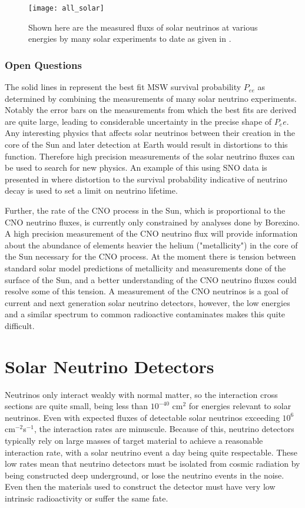 \begin{figure}
\centering
\texttt{[image: all\_solar]}
\caption{\label{fig:global_solar}Shown here are the measured fluxs of solar neutrinos at various energies by many solar experiments to date as given in \cite{nonstandard_interactions}.}
\end{figure}

\subsection{Open Questions}
The solid lines in  represent the best fit MSW survival probability $P_{ee}$ as determined by combining the measurements of many solar neutrino experiments.
Notably the error bars on the measurements from which the best fits are derived are quite large, leading to considerable uncertainty in the precise shape of $P_ee$.
Any interesting physics that affects solar neutrinos between their creation in the core of the Sun and later detection at Earth would result in distortions to this function.
Therefore high precision measurements of the solar neutrino fluxes can be used to search for new physics. 
An example of this using SNO data is presented in  where distortion to the survival probability indicative of neutrino decay is used to set a limit on neutrino lifetime.

Further, the rate of the CNO process in the Sun, which is proportional to the CNO neutrino fluxes, is currently only constrained by analyses done by Borexino.
A high precision measurement of the CNO neutrino flux will provide information about the abundance of elements heavier the helium ("metallicity") in the core of the Sun necessary for the CNO process.
At the moment there is tension between standard solar model predictions of metallicity and measurements done of the surface of the Sun, and a better understanding of the CNO neutrino fluxes could resolve some of this tension.
A measurement of the CNO neutrinos is a goal of current and next generation solar neutrino detectors, however, the low energies and a similar spectrum to common radioactive contaminates makes this quite difficult.

\chapter{Solar Neutrino Detectors}
\label{ch:detectors}

Neutrinos only interact weakly with normal matter, so the interaction cross sections are quite small, being less than $10^{-40}$ cm$^2$ for energies relevant to solar neutrinos.
Even with expected fluxes of detectable solar neutrinos exceeding $10^6$ cm$^{-2}$s$^{-1}$, the interaction rates are minuscule.
Because of this, neutrino detectors typically rely on large masses of target material to achieve a reasonable interaction rate, with a solar neutrino event a day being quite respectable.
These low rates mean that neutrino detectors must be isolated from cosmic radiation by being constructed deep underground, or lose the neutrino events in the noise.
Even then the materials used to construct the detector must have very low intrinsic radioactivity or suffer the same fate.

